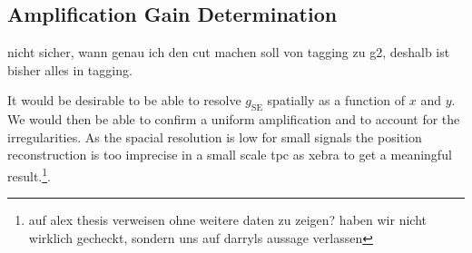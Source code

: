 
\FloatBarrier
\subsection{Amplification Gain Determination}
\label{ssec:g2}
\FloatBarrier

nicht sicher, wann genau ich den cut machen soll von tagging zu g2, deshalb ist bisher alles in tagging.



It would be desirable to be able to resolve $ g_\mathrm{SE} $ spatially as a function of $ x $ and $ y $.
We would then be able to confirm a uniform amplification and to account for the irregularities.
As the spacial resolution is low for small signals the position reconstruction is too imprecise in a small scale \gls{tpc} as \gls{xebra} to get a meaningful result.\footnote{auf alex thesis verweisen ohne weitere daten zu zeigen? haben wir nicht wirklich gecheckt, sondern uns auf darryls aussage verlassen}.
